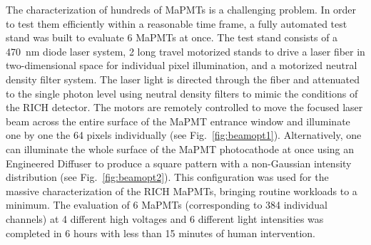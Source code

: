\documentclass[5p,times,twocolumn]{elsarticle}
\begin{document}
The characterization of hundreds of MaPMTs is a  challenging problem. In order to test them efficiently within a
reasonable time frame, a fully automated test stand was built to evaluate 6 MaPMTs at once. The test stand consists
of a 470~nm diode laser system, 2 long travel motorized stands to drive a laser fiber in two-dimensional space for
individual pixel illumination, and a motorized neutral density filter system. The laser light is directed through the
fiber and attenuated to the single photon level using neutral density filters to mimic the conditions of the RICH
detector. The motors are remotely controlled to move the focused laser beam across the entire surface of the MaPMT
entrance window and illuminate one by one the 64 pixels individually (see Fig.~\ref{fig:beamopt1}). Alternatively, one
can illuminate the whole surface of the MaPMT photocathode at once using an Engineered Diffuser to produce a square
pattern with a non-Gaussian intensity distribution (see Fig.~\ref{fig:beamopt2}).  This configuration was used for the
massive characterization of the RICH MaPMTs, bringing routine workloads to a minimum. The evaluation of 6 MaPMTs
(corresponding to 384 individual channels) at 4 different high voltages and 6 different light intensities was completed
in 6 hours with less than 15 minutes of human intervention.
\end{document}
